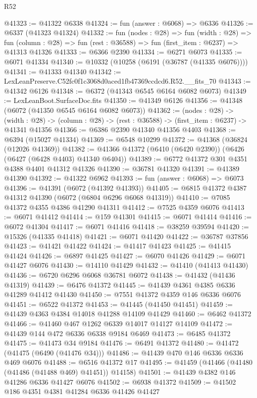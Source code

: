 \begin{lexlean}{R52}
\begin{coremodule}
@41323 := @41322 @6338
@41324 := fun (answer : @6068) => @6336
@41326 := @6337 (@41323 @41324)
@41332 := fun (nodes : @28) =>
  fun (width : @28) =>
  fun (column : @28) => fun (rest : @36588) => fun (first_item : @6237) => @41313 @41326
@41333 := @6366 @2390
@41334 := @6271 @6073
@41335 := @6071 @41334
@41340 := @10332 (@10258 (@6191 (@36787 (@41335 @6076))))
@41341 := @41333 @41340
@41342 := LexLeanPreserve.C52fc0f1c3068d0aced1fb47369ccdcd6.R52.__fits_70
@41343 := @41342 @6126
@41348 := @6372 (@41343 @6545 @6164 @6082 @6073)
@41349 := LexLeanBoot.SurfaceDoc.fits
@41350 := @41349 @6126
@41356 := @41348 (@6072 (@41350 @6545 @6164 @6082 @6073))
@41362 := (nodes : @28) ->
  (width : @28) -> (column : @28) -> (rest : @36588) -> (first_item : @6237) -> @41341 @41356
@41366 := @6386 @2390 @41340 @41356 @4403
@41368 := @6394 (@15027 @41334)
@41369 := @6548 @10299
@41372 := @41368 (@36824 (@12026 @41369))
@41382 := @41366 @41372 (@6410 (@6420 @2390)) (@6426 (@6427 (@6428 @4403) @41340 @6404))
@41389 := @6772 @41372 @301 @4351 @4388 @4401 @41312 @41326
@41390 := @36781 @41320
@41391 := @41389 @41390
@41392 := @41322 @6962
@41393 := fun (answer : @6068) => @6073
@41396 := @41391 (@6072 (@41392 @41393))
@41405 := @6815 @41372 @4387 @41312 @41390 (@6072 (@6804 @6296 @6068 @41319))
@41410 := @7085 @41372 @4355 @4386 @41290 @41311
@41412 := @7525 @4359 @6076
@41413 := @6071 @41412
@41414 := @159 @41301
@41415 := @6071 @41414
@41416 := @6072 @41304
@41417 := @6071 @41416
@41418 := @38259 @39594
@41420 := @15326 (@41335 @41418)
@41421 := @6071 @41420
@41422 := @36787 @37856
@41423 := @41421 @41422
@41424 := @41417 @41423
@41425 := @41415 @41424
@41426 := @6897 @41425
@41427 := @6070 @41426
@41429 := @6071 @41427 @6076
@41430 := @14110 @41429
@41432 := @41410 (@41413 @41430)
@41436 := @6720 @6296 @6068 @36781 @6072
@41438 := @41432 (@41436 @41319)
@41439 := @6476 @41372
@41445 := @41439 @4361 @4385 @6336 @41289 @41412 @41430
@41450 := @7551 @41372 @4359 @146 @6336 @6076
@41451 := @6522 @41372
@41453 := @41445 (@41450 @41451)
@41459 := @41439 @4363 @4384 @14018 @41288 @14109 @41429
@41460 := @6462 @41372
@41466 := @41460 @467 @1262 @6339 @14017 @14127 @14109
@41472 := @41439 @144 @472 @6336 @6338 @9184 @6469
@41473 := @6485 @41372
@41475 := @41473 @34 @9184
@41476 := @6491 @41372
@41480 := @41472 (@41475 (@6490 (@41476 @34)))
@41486 := @41439 @470 @146 @6336 @6336 @469 @6076
@41488 := @6516 @41372 @17
@41495 := @41459 (@41466 (@41480 (@41486 (@41488 @469) @41451)) @14158)
@41501 := @41439 @4382 @146 @41286 @6336 @41427 @6076
@41502 := @6938 @41372
@41509 := @41502 @186 @4351 @4381 @41284 @6336 @41426 @41427

\end{coremodule}
\end{lexlean}
